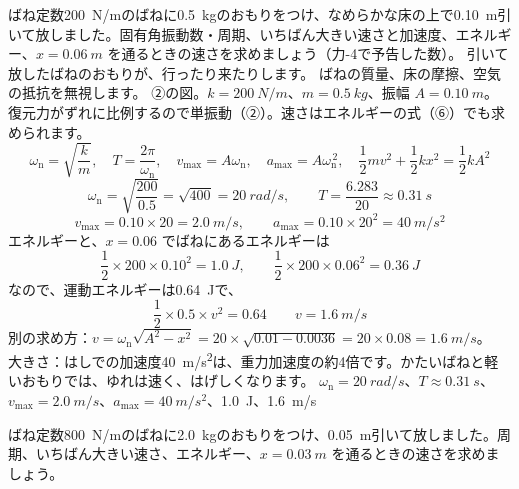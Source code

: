 \label{ph:波-1:ex3}
\begin{phreidai}[ばねとおもりの単振動]
ばね定数\qty{200}{N/m}のばねに\qty{0.5}{kg}のおもりをつけ、なめらかな床の上で\qty{0.10}{m}引いて放しました。固有角振動数・周期、いちばん大きい速さと加速度、エネルギー、$x=\qty{0.06}{m}$ を通るときの速さを求めましょう（力-4で予告した数）。
\phbamen
引いて放したばねのおもりが、行ったり来たりします。
\phmushi
ばねの質量、床の摩擦、空気の抵抗を無視します。
\phzu
②の図。$k=\qty{200}{N/m}$、$m=\qty{0.5}{kg}$、振幅 $A=\qty{0.10}{m}$。
\phriyu
復元力がずれに比例するので単振動（②）。速さはエネルギーの式（⑥）でも求められます。
\phtateru
\[\omega_{\mathrm n}=\sqrt{\frac{k}{m}},\quad T=\frac{2\pi}{\omega_{\mathrm n}},\quad v_{\max}=A\omega_{\mathrm n},\quad a_{\max}=A\omega_{\mathrm n}^{\,2},\quad \frac{1}{2}mv^2+\frac{1}{2}kx^2=\frac{1}{2}kA^2\]
\phtoku
\[\omega_{\mathrm n}=\sqrt{\frac{200}{0.5}}=\sqrt{400}=\qty{20}{rad/s},\qquad T=\frac{6.283}{20}\approx\qty{0.31}{s}\]
\[v_{\max}=0.10\times20=\qty{2.0}{m/s},\qquad a_{\max}=0.10\times20^2=\qty{40}{m/s^2}\]
エネルギーと、$x=0.06$ でばねにあるエネルギーは
\[\frac{1}{2}\times200\times0.10^2=\qty{1.0}{J},\qquad \frac{1}{2}\times200\times0.06^2=\qty{0.36}{J}\]
なので、運動エネルギーは\qty{0.64}{J}で、
\[\frac{1}{2}\times0.5\times v^2=0.64\qquad v=\qty{1.6}{m/s}\]
\phtashikame
別の求め方：$v=\omega_{\mathrm n}\sqrt{A^2-x^2}=20\times\sqrt{0.01-0.0036}=20\times0.08=\qty{1.6}{m/s}$。\\
大きさ：はしでの加速度\qty{40}{m/s^2}は、重力加速度の約4倍です。かたいばねと軽いおもりでは、ゆれは速く、はげしくなります。
\kotae $\omega_{\mathrm n}=\qty{20}{rad/s}$、$T\approx\qty{0.31}{s}$、$v_{\max}=\qty{2.0}{m/s}$、$a_{\max}=\qty{40}{m/s^2}$、\qty{1.0}{J}、\qty{1.6}{m/s}
\end{phreidai}
\begin{jibun}
ばね定数\qty{800}{N/m}のばねに\qty{2.0}{kg}のおもりをつけ、\qty{0.05}{m}引いて放しました。周期、いちばん大きい速さ、エネルギー、$x=\qty{0.03}{m}$ を通るときの速さを求めましょう。
\end{jibun}

